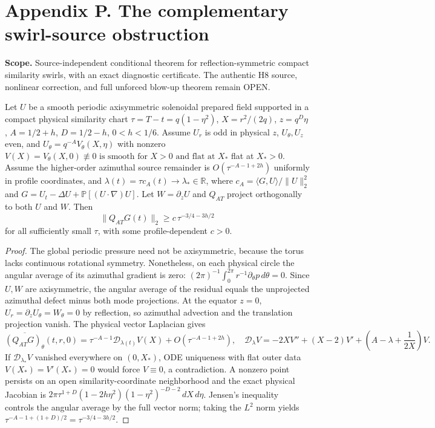 \clearpage
\section*{Appendix P. The complementary swirl-source obstruction}
\noindent\textbf{Scope.} Source-independent conditional theorem for reflection-symmetric compact similarity swirls, with an exact diagnostic certificate. The authentic H8 source, nonlinear correction, and full unforced blow-up theorem remain OPEN.

\begin{theorem}
Let $U$ be a smooth periodic axisymmetric solenoidal prepared field supported in a compact physical similarity chart $\tau=T-t=q(1-\eta^2)$, $X=r^2/(2q)$, $z=q^D\eta$, $A=1/2+h$, $D=1/2-h$, $0<h<1/6$. Assume $U_r$ is odd in physical $z$, $U_\theta,U_z$ even, and $U_\theta=q^{-A}V_\theta(X,\eta)$ with nonzero $V(X)=V_\theta(X,0)\not\equiv0\text{ is smooth for }X>0\text{ and flat at }X_*$ flat at $X_*>0$. Assume the higher-order azimuthal source remainder is $O(\tau^{-A-1+2h})$ uniformly in profile coordinates, and $\lambda(t)=\tau c_A(t)\to\lambda_*\in\mathbb R$, where $c_A=\langle G,U\rangle/\|U\|_2^2$ and $G=U_t-\Delta U+\mathbb P[(U\cdot\nabla)U]$. Let $W=\partial_zU$ and $Q_{AT}$ project orthogonally to both $U$ and $W$. Then
\[
\boxed{\|Q_{AT}G(t)\|_2\ge c\,\tau^{-3/4-3h/2}}
\]
for all sufficiently small $\tau$, with some profile-dependent $c>0$.
\end{theorem}
\begin{proof}
The global periodic pressure need not be axisymmetric, because the torus lacks continuous rotational symmetry. Nonetheless, on each physical circle the angular average of its azimuthal gradient is zero: $(2\pi)^{-1}\int_0^{2\pi}r^{-1}\partial_\theta p\,d\theta=0$. Since $U,W$ are axisymmetric, the angular average of the residual equals the unprojected azimuthal defect minus both mode projections. At the equator $z=0$, $U_r=\partial_zU_\theta=W_\theta=0$ by reflection, so azimuthal advection and the translation projection vanish. The physical vector Laplacian gives
\[
\overline{(Q_{AT}G)_\theta}(t,r,0)
=\tau^{-A-1}\mathcal D_{\lambda(t)}V(X)+O(\tau^{-A-1+2h}),
\quad
\mathcal D_\lambda V=-2XV''+(X-2)V'
+\left(A-\lambda+\frac1{2X}\right)V.
\]
If $\mathcal D_{\lambda_*}V$ vanished everywhere on $(0,X_*)$, ODE uniqueness with flat outer data $V(X_*)=V'(X_*)=0$ would force $V\equiv0$, a contradiction. A nonzero point persists on an open similarity-coordinate neighborhood and the exact physical Jacobian is
$2\pi\tau^{1+D}(1-2h\eta^2)(1-\eta^2)^{-D-2}\,dX\,d\eta$.
Jensen's inequality controls the angular average by the full vector norm; taking the $L^2$ norm yields $\tau^{-A-1+(1+D)/2}=\tau^{-3/4-3h/2}$.
\end{proof}

